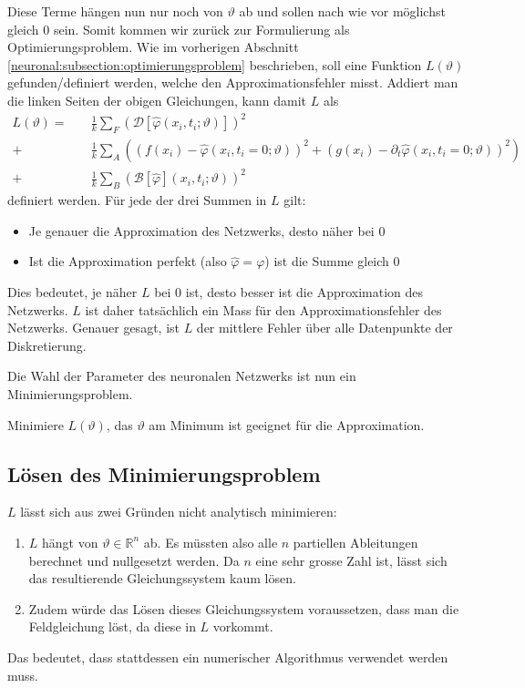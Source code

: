 Diese Terme hängen nun nur noch von $\vartheta$ ab und sollen nach wie vor möglichst gleich 0 sein.
Somit kommen wir zurück zur Formulierung als Optimierungsproblem.
Wie im vorherigen Abschnitt \ref{neuronal:subsection:optimierungsproblem} beschrieben, soll eine Funktion $L(\vartheta)$ gefunden/definiert werden, welche den Approximationsfehler misst.
Addiert man die linken Seiten der obigen Gleichungen, kann damit \( L \) als
\begin{equation}
    \begin{aligned}
        L(\vartheta) =\quad &\frac{1}{k} \sum_{F}^{} \left(\mathcal{D}[\hat{\varphi}(x_i, t_i; \vartheta)]\right)^2\\
        + &\frac{1}{k} \sum_{A}^{} \left(\left(f(x_i) - \hat{\varphi}(x_i, t_i = 0; \vartheta)\right)^2
        + \left(g(x_i) - \partial_t \hat{\varphi}(x_i, t_i = 0; \vartheta)\right)^2\right)\\
        + &\frac{1}{k} \sum_{B}^{} \left(\mathcal{B}[\hat{\varphi}](x_i, t_i; \vartheta)\right)^2
    \end{aligned}
    \label{neuronal:optimierung}
\end{equation}
definiert werden.
Für jede der drei Summen in \( L \) gilt:
\begin{itemize}
    \item Je genauer die Approximation des Netzwerks, desto näher bei 0
    \item Ist die Approximation perfekt (also \( \hat{\varphi} = \varphi \)) ist die Summe gleich 0
\end{itemize}
Dies bedeutet, je näher \( L \) bei 0 ist, desto besser ist die Approximation des Netzwerks.
$L$ ist daher tatsächlich ein Mass für den Approximationsfehler des Netzwerks.
Genauer gesagt, ist $L$ der mittlere Fehler über alle Datenpunkte der Diskretierung.

Die Wahl der Parameter des neuronalen Netzwerks ist nun ein Minimierungsproblem.
\begin{aufgabe}
    Minimiere $L(\vartheta)$, das $\vartheta$ am Minimum ist geeignet für die Approximation.
\end{aufgabe}

\subsection{Lösen des Minimierungsproblem}\label{neuronal:subsection:lösen_optimierungsproblem}
\( L \) lässt sich aus zwei Gründen nicht analytisch minimieren:
\begin{enumerate}
    \item \( L \) hängt von \( \vartheta \in \mathbb{R}^n \) ab. 
    Es müssten also alle \( n \) partiellen Ableitungen berechnet und nullgesetzt werden. 
    Da \( n \) eine sehr grosse Zahl ist, lässt sich das resultierende Gleichungssystem kaum lösen.
    \item Zudem würde das Lösen dieses Gleichungssystem voraussetzen, dass man die Feldgleichung löst, da diese in $L$ vorkommt.
\end{enumerate}
Das bedeutet, dass stattdessen ein numerischer Algorithmus verwendet werden muss.

